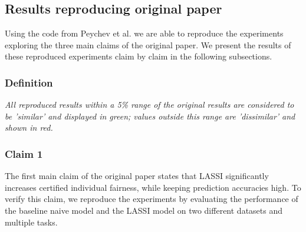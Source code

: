 \subsection{Results reproducing original paper}\label{sec:reproduced_results}

Using the code from Peychev et al. \cite{peychev2022latent} we are able to reproduce the experiments exploring the three main claims of the original paper. We present the results of these reproduced experiments claim by claim in the following subsections.

\subsubsection{Definition} \textit{All reproduced results within a 5\% range of the original results are considered to be 'similar' and displayed in \colorbox{mygreen}{green}; values outside this range are 'dissimilar' and shown in \colorbox{myred}{red}.}



\subsubsection{Claim 1} The first main claim of the original paper states that LASSI significantly increases certified individual fairness, while keeping prediction accuracies high. To verify this claim, we reproduce the experiments by evaluating the performance of the baseline naive model and the LASSI model on two different datasets and multiple tasks. \newline



